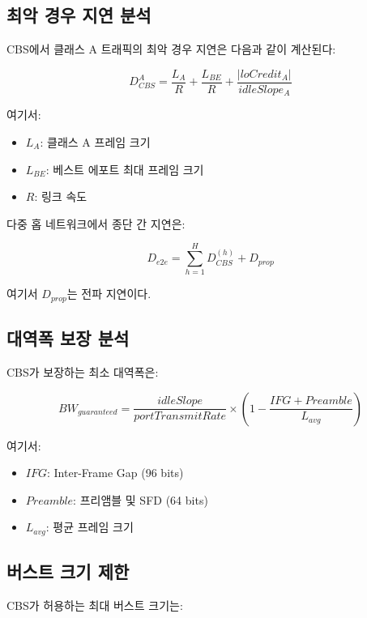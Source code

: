 \documentclass[twocolumn,10pt]{article}
\begin{document}
\subsection{최악 경우 지연 분석}

CBS에서 클래스 A 트래픽의 최악 경우 지연은 다음과 같이 계산된다:

\begin{equation}
D_{CBS}^A = \frac{L_A}{R} + \frac{L_{BE}}{R} + \frac{|loCredit_A|}{idleSlope_A}
\end{equation}

여기서:
\begin{itemize}
    \item $L_A$: 클래스 A 프레임 크기
    \item $L_{BE}$: 베스트 에포트 최대 프레임 크기
    \item $R$: 링크 속도
\end{itemize}

다중 홉 네트워크에서 종단 간 지연은:

\begin{equation}
D_{e2e} = \sum_{h=1}^{H} D_{CBS}^{(h)} + D_{prop}
\end{equation}

여기서 $D_{prop}$는 전파 지연이다.

\subsection{대역폭 보장 분석}

CBS가 보장하는 최소 대역폭은:

\begin{equation}
BW_{guaranteed} = \frac{idleSlope}{portTransmitRate} \times \left(1 - \frac{IFG + Preamble}{L_{avg}}\right)
\end{equation}

여기서:
\begin{itemize}
    \item $IFG$: Inter-Frame Gap (96 bits)
    \item $Preamble$: 프리앰블 및 SFD (64 bits)
    \item $L_{avg}$: 평균 프레임 크기
\end{itemize}

\subsection{버스트 크기 제한}

CBS가 허용하는 최대 버스트 크기는:
\end{document}
